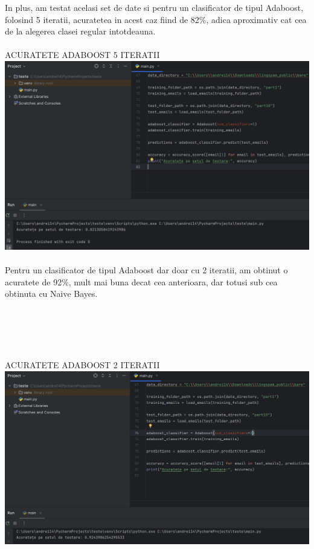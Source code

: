 \documentclass[11pt,leqno]{article}
\begin{document}
{		In plus, am testat acelasi set de date si pentru un clasificator de tipul Adaboost, folosind 5 iteratii, acuratetea in acest caz fiind de 82\%, adica aproximativ cat cea de la alegerea clasei regular intotdeauna. \\\\
		ACURATETE ADABOOST 5 ITERATII\\
		\includegraphics[scale=0.6]{adaboost} \\\\
		Pentru un clasificator de tipul Adaboost dar doar cu 2 iteratii, am obtinut o acuratete de 92\%, mult mai buna decat cea anterioara, dar totusi sub cea obtinuta cu Naive Bayes.\\\\\\\\\\\\
		ACURATETE ADABOOST 2 ITERATII\\
		\includegraphics[scale=0.6]{adaboost2} \\\\
}
\end{document}
